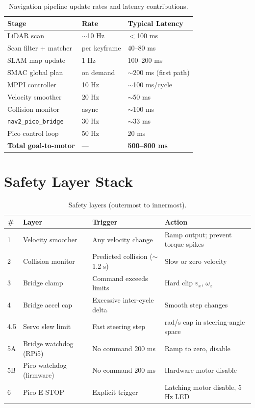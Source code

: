 \documentclass[12pt,a4paper]{report}
\begin{document}
\begin{table}[H]
\centering
\caption{Navigation pipeline update rates and latency contributions.}
\label{tab:latency}
\begin{tabularx}{\textwidth}{|p{5.2cm}|p{2.4cm}|X|}
\hline
\textbf{Stage} & \textbf{Rate} & \textbf{Typical Latency} \\
\hline
LiDAR scan & $\sim$10 Hz & $<$100 ms \\
\hline
Scan filter + matcher & per keyframe & 40--80 ms \\
\hline
SLAM map update & 1 Hz & 100--200 ms \\
\hline
SMAC global plan & on demand & $\sim$200 ms (first path) \\
\hline
MPPI controller & 10 Hz & $\sim$100 ms/cycle \\
\hline
Velocity smoother & 20 Hz & $\sim$50 ms \\
\hline
Collision monitor & async & $\sim$100 ms \\
\hline
\texttt{nav2\_pico\_bridge} & 30 Hz & $\sim$33 ms \\
\hline
Pico control loop & 50 Hz & 20 ms \\
\hline
\textbf{Total goal-to-motor} & --- & \textbf{500--800 ms} \\
\hline
\end{tabularx}
\end{table}

\section{Safety Layer Stack}

\begin{table}[H]
\centering
\caption{Safety layers (outermost to innermost).}
\label{tab:safety_layers}
\begin{tabularx}{\textwidth}{|p{0.5cm}|p{3.4cm}|p{4.2cm}|X|}
\hline
\textbf{\#} & \textbf{Layer} & \textbf{Trigger} & \textbf{Action} \\
\hline
1 & Velocity smoother & Any velocity change & Ramp output; prevent torque spikes \\
\hline
2 & Collision monitor & Predicted collision ($\sim$1.2 s) & Slow or zero velocity \\
\hline
3 & Bridge clamp & Command exceeds limits & Hard clip $v_x$, $\omega_z$ \\
\hline
4 & Bridge accel cap & Excessive inter-cycle delta & Smooth step changes \\
\hline
4.5 & Servo slew limit & Fast steering step & rad/s cap in steering-angle space \\
\hline
5A & Bridge watchdog (RPi5) & No command 200 ms & Ramp to zero, disable \\
\hline
5B & Pico watchdog (firmware) & No command 200 ms & Hardware motor disable \\
\hline
6 & Pico E-STOP & Explicit trigger & Latching motor disable, 5 Hz LED \\
\hline
\end{tabularx}
\end{table}
\end{document}
